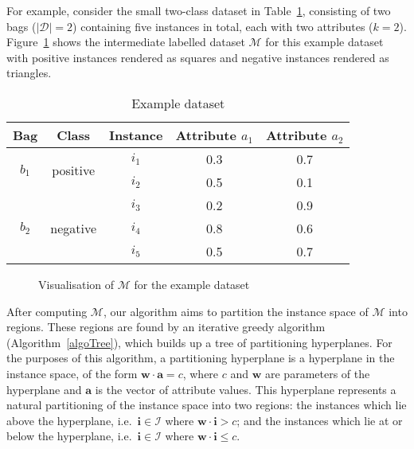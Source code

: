 \documentclass[a4paper,12pt]{report} %
\newcommand{\mcl}[1]{\mathcal{#1}}
\newcommand{\vect}[1]{\boldsymbol{#1}}
\begin{document}
For example, consider the small two-class dataset in Table~\ref{tEgData}, 
    consisting of two bags ($|\mcl{D}| = 2$)
    containing five instances in total, each with two attributes ($k=2$).
Figure~\ref{visM} shows the intermediate labelled dataset $\mcl{M}$ 
    for this example dataset with 
    positive instances rendered as squares and 
    negative instances rendered as triangles.

\begin{table}
\begin{center}
\begin{tabular}{ccccc}
    \toprule
    Bag & Class & Instance & Attribute $a_1$ & Attribute $a_2$ \\
    \midrule
    \multirow{2}{*}{$b_1$} & \multirow{2}{*}{positive} & $i_1$ & 0.3 & 0.7 \\
    &  & $i_2$ & 0.5 & 0.1 \\
    \cmidrule(r){1-5}
    \multirow{3}{*}{$b_2$} & \multirow{3}{*}{negative} & $i_3$ & 0.2 & 0.9 \\
    & & $i_4$ & 0.8 & 0.6 \\
    & & $i_5$ & 0.5 & 0.7 \\
    \bottomrule
    
\end{tabular}
\end{center}
\caption{Example dataset}
\label{tEgData}
\end{table}

\begin{figure}
\begin{center}
\end{center}
\caption{Visualisation of $\mcl{M}$ for the example dataset}
\label{visM}
\end{figure}

After computing $\mcl{M}$, 
    our algorithm
    aims to partition the instance space of $\mcl{M}$ into regions.
These regions are found by an iterative greedy algorithm (Algorithm~\ref{algoTree}), 
    which builds up a tree of partitioning hyperplanes.
For the purposes of this algorithm, 
    a partitioning hyperplane is a hyperplane in the instance space, 
    of the form $\vect{w} \cdot \vect{a} = c$,
    where $c$ and $\vect{w}$ are parameters of the hyperplane and 
    $\vect{a}$ is the vector of attribute values.
This hyperplane represents a natural partitioning of the instance space
    into two regions:
        the instances which lie above the hyperplane, 
            i.e.\ $\vect{i} \in \mcl{I}$ where $\vect{w} \cdot \vect{i} > c$; and
        the instances which lie at or below the hyperplane,
            i.e.\ $\vect{i} \in \mcl{I}$ where $\vect{w} \cdot \vect{i} \leq c$.
    
\end{document}
